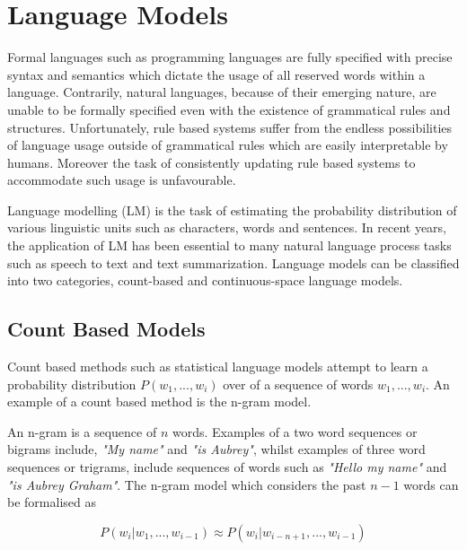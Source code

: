 \section{Language Models}
Formal languages such as programming languages are fully specified with precise syntax and semantics which dictate the usage of all reserved words within a language. Contrarily, natural languages, because of their emerging nature, are unable to be formally specified even with the existence of grammatical rules and structures. Unfortunately, rule based systems suffer from the endless possibilities of language usage outside of grammatical rules which are easily interpretable by humans. Moreover the task of consistently updating rule based systems to accommodate such usage is unfavourable.  

\noindent
\newline
Language modelling (LM) is the task of estimating the probability distribution of various linguistic units such as characters, words and sentences. In recent years, the application of LM  has been essential to many natural language process tasks such as speech to text and text summarization. Language models can be classified into two categories, count-based and continuous-space language models. 

\subsection{Count Based Models}
Count based methods such as statistical language models attempt to learn a probability distribution \(P(w_{1},...,w_{i}) \) over of a sequence of words \(w_{1},...,w_{i}\). An example of a count based method is the n-gram model.

\noindent
\newline
An n-gram is a sequence of \(n\) words. Examples of a two word sequences or bigrams include, \textit{"My name"} and \textit{"is Aubrey"}, whilst examples of three word sequences or trigrams, include sequences of words such as \textit{"Hello my name"} and \textit{"is Aubrey Graham"}. The n-gram model which considers the past \(n-1\) words can be formalised as 

\begin{equation}
	P(w_{i} | w_{1},...,w_{i-1}) \approx P(w_{i} | w_{i-n+1},...,w_{i-1})
\end{equation}

